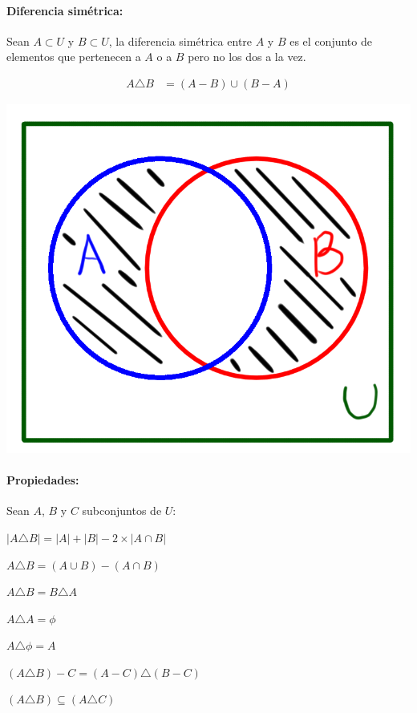 \paragraph{Diferencia simétrica:} Sean $A\subset U$ y $B\subset U$, la diferencia simétrica entre $A$ y $B$ es el conjunto de elementos que pertenecen a $A$ o a $B$ pero no los dos a la vez.
        \begin{center}
    \begin{minipage}{0.4\textwidth}
        \begin{align*}
            A \triangle B &= (A-B)\cup(B-A)
        \end{align*}
    \end{minipage}
    \begin{minipage}{0.4\textwidth}
         \includegraphics[scale=0.3]{imagenes/symetrical_difference.png}
    \end{minipage}
    \end{center}
    
\paragraph{Propiedades:} Sean $A$, $B$ y $C$ subconjuntos de $U$:
        \begin{itemize}
    \begin{multicols}{2}
    \item $|A\triangle B| = |A| + |B| - 2\times|A\cap B|$        
        \item $A\triangle B = (A\cup B) - (A\cap B)$
        \item $A\triangle B = B\triangle A$
        \item $A\triangle A = \phi$
        \item $A\triangle\phi = A$
        \item $(A\triangle B) - C = (A - C)\triangle (B-C)$
        \item $(A\triangle B)\subseteq (A\triangle C)$
        \end{multicols}
    \end{itemize}
    
